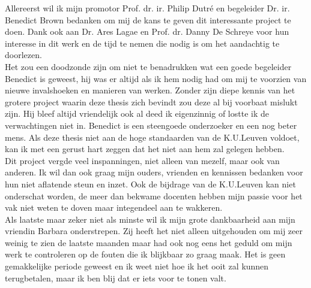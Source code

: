 \documentclass[master=cws]{kulemt}
\begin{document}
\begin{preface}
	Allereerst wil ik mijn promotor Prof. dr. ir. Philip Dutr\'e en begeleider Dr. ir. Benedict Brown bedanken om mij de kans te geven dit interessante project te doen. Dank ook aan Dr. Ares Lagae en Prof. dr. Danny De Schreye voor hun interesse in dit werk en de tijd te nemen die nodig is om het aandachtig te doorlezen.\\
	
	Het zou een doodzonde zijn om niet te benadrukken wat een goede begeleider Benedict is geweest, hij was er altijd als ik hem nodig had om mij te voorzien van nieuwe invalshoeken en manieren van werken. Zonder zijn diepe kennis van het grotere project waarin deze thesis zich bevindt zou deze al bij voorbaat mislukt zijn. Hij bleef altijd vriendelijk ook al deed ik eigenzinnig of lostte ik de verwachtingen niet in. Benedict is een steengoede onderzoeker en een nog beter mens. Als deze thesis niet aan de hoge standaarden van de K.U.Leuven voldoet, kan ik met een gerust hart zeggen dat het niet aan hem zal gelegen hebben.\\
	
	Dit project vergde veel inspanningen, niet alleen van mezelf, maar ook van anderen. Ik wil dan ook graag mijn ouders, vrienden en kennissen bedanken voor hun niet aflatende steun en inzet. Ook de bijdrage van de K.U.Leuven kan niet onderschat worden, de meer dan bekwame docenten hebben mijn passie voor het vak niet weten te doven maar integendeel aan te wakkeren.\\
	
	Als laatste maar zeker niet als minste wil ik mijn grote dankbaarheid aan mijn vriendin Barbara onderstrepen. Zij heeft het niet alleen uitgehouden om mij zeer weinig te zien de laatste maanden maar had ook nog eens het geduld om mijn werk te controleren op de fouten die ik blijkbaar zo graag maak. Het is geen gemakkelijke periode geweest en ik weet niet hoe ik het ooit zal kunnen terugbetalen, maar ik ben blij dat er iets voor te tonen valt.
\end{preface}

\tableofcontents*
\end{document}
